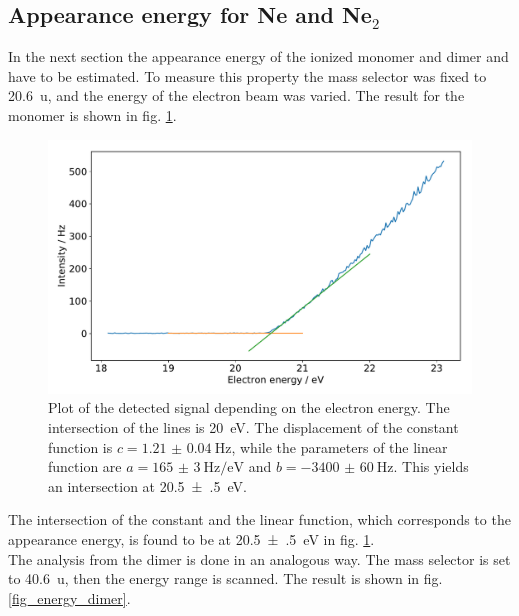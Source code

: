 \documentclass[a4paper,10pt]{article}
\begin{document}
\subsection{Appearance energy for Ne and Ne$_2$}
In the next section the appearance energy of the ionized monomer and dimer  and  have to be estimated. To measure this property the mass selector was fixed to \SI{20.6}{\atomicmassunit}, and the energy of the electron beam was varied. The result for the monomer is shown in fig. \ref{fig_energy_monomer}.
\begin{figure}[H]
	\centering
	\includegraphics[width = 0.8 \textwidth]{energy_ne.pdf}
	\caption{Plot of the detected signal depending on the electron energy. The intersection of the lines is \SI{20}{\electronvolt}. The displacement of the constant function is $c=\SI{1.21(4)}{\hertz}$, while the parameters of the linear function are $a = \SI{165(3)}{\hertz \per \electronvolt}$ and $b = \SI{-3400(60)}{\hertz}$. This yields an intersection at \SI{20.5(5)}{\electronvolt}. }
	\label{fig_energy_monomer}
\end{figure}
The intersection of the constant and the linear function, which corresponds to the appearance energy, is found to be at \SI{20.5(5)}{\electronvolt} in fig. \ref{fig_energy_monomer}. \\
The analysis from the dimer is done in an analogous way. The mass selector is set to \SI{40.6}{\atomicmassunit}, then the energy range is scanned. The result is shown in fig. \ref{fig_energy_dimer}.
\end{document}
